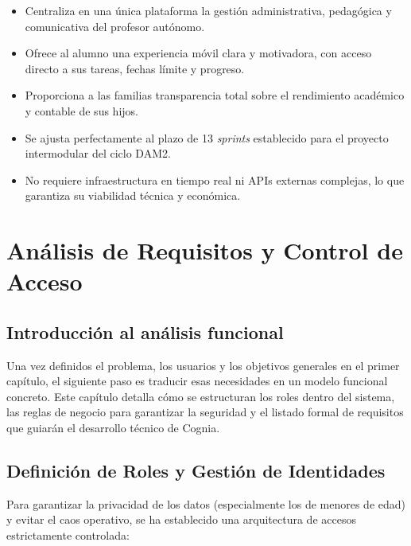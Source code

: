 \documentclass[12pt,a4paper]{report}
\begin{document}
\begin{itemize}
    \item Centraliza en una única plataforma la gestión administrativa,
    pedagógica y comunicativa del profesor autónomo.
    \item Ofrece al alumno una experiencia móvil clara y motivadora,
    con acceso directo a sus tareas, fechas límite y progreso.
    \item Proporciona a las familias transparencia total sobre el
    rendimiento académico y contable de sus hijos.
    \item Se ajusta perfectamente al plazo de 13 \textit{sprints}
    establecido para el proyecto intermodular del ciclo DAM2.
    \item No requiere infraestructura en tiempo real ni APIs externas
    complejas, lo que garantiza su viabilidad técnica y económica.
\end{itemize}

\chapter{Análisis de Requisitos y Control de Acceso}

\section{Introducción al análisis funcional}

Una vez definidos el problema, los usuarios y los objetivos generales en el primer capítulo, el siguiente paso es traducir esas necesidades en un modelo funcional concreto. Este capítulo detalla cómo se estructuran los roles dentro del sistema, las reglas de negocio para garantizar la seguridad y el listado formal de requisitos que guiarán el desarrollo técnico de Cognia.

\section{Definición de Roles y Gestión de Identidades}

Para garantizar la privacidad de los datos (especialmente los de menores de edad) y evitar el caos operativo, se ha establecido una arquitectura de accesos estrictamente controlada:
\end{document}
